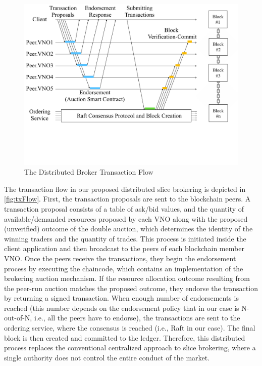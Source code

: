 




\begin{figure}%
    \centering
    \includegraphics[width=0.8\columnwidth]{Figures/txFlow.pdf}
    \caption{The Distributed Broker Transaction Flow}
    \label{fig:txFlow}
\end{figure}
The transaction flow in our proposed distributed slice brokering is depicted in \autoref{fig:txFlow}. First, the transaction proposals are sent to the blockchain peers. A transaction proposal consists of a table of ask/bid values, and the quantity of available/demanded resources proposed by each \ac{VNO} along with the proposed (unverified) outcome of the double auction, which determines the identity of the winning traders and the quantity of trades. This process is initiated inside the client application and then broadcast to the peers of each blockchain member \ac{VNO}. Once the peers receive the transactions, they begin the endorsement process by executing the chaincode, which contains an implementation of the brokering auction mechanism. If the resource allocation outcome resulting from the peer-run auction matches the proposed outcome, they endorse the transaction by returning a signed transaction. When enough number of endorsements is reached (this number depends on the endorsement policy that in our case is N-out-of-N, i.e., all the peers have to endorse), the transactions are sent to the ordering service, where the consensus is reached (i.e., Raft in our case). The final block is then created and committed to the ledger. Therefore, this distributed process replaces the conventional centralized approach to slice brokering, where a single authority does not control the entire conduct of the market.
